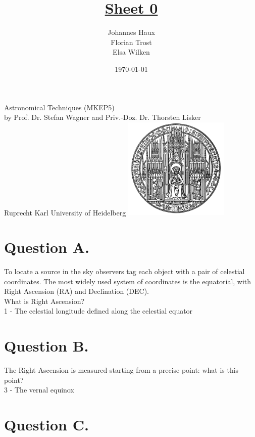 \documentclass[11pt,a4paper,twoside]{article}
\title{\LARGE \underline {Sheet 0}}
\author{Johannes Haux \\ Florian Trost \\ Elsa Wilken}
\date{\today}
\begin{document}
\maketitle
\thispagestyle{empty}

\begin{center}
  Astronomical Techniques (MKEP5) \\
  \baselineskip35pt
  by Prof. Dr. Stefan Wagner and Priv.-Doz. Dr. Thorsten Lisker \\
  \baselineskip60pt
  Ruprecht Karl University of Heidelberg
\vskip 40pt
\includegraphics[width=5cm]{./pic/UniHD.png}

\end{center}

\newpage
\setcounter{page}{1}		%

\section*{Question A.} 

To locate a source in the sky observers tag each object with a pair of celestial coordinates. The most widely used system of coordinates is the equatorial, with Right Ascension (RA) and Declination (DEC). \\

What is Right Ascension? \\

1 - The celestial longitude defined along the celestial equator

\section*{Question B.}

The Right Ascension is measured starting from a precise point: what is this point? \\

3 - The vernal equinox

\section*{Question C.}
\end{document}
